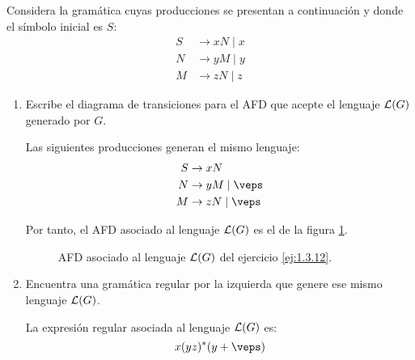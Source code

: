 \begin{ejercicio}\label{ej:1.3.12}
    Considera la gramática cuyas producciones se presentan a continuación y donde el símbolo inicial es $S$:
    \begin{align*}
        S &\rightarrow xN\mid  x \\
        N &\rightarrow yM\mid  y \\
        M &\rightarrow zN\mid  z
    \end{align*}
    \begin{enumerate}
        \item Escribe el diagrama de transiciones para el AFD que acepte el lenguaje $\mathcal{L}(G)$ generado por $G$.
        
        Las siguientes producciones generan el mismo lenguaje:
        \begin{align*}
            S &\rightarrow xN\\
            N &\rightarrow yM\mid \veps \\
            M &\rightarrow zN\mid \veps
        \end{align*}

        Por tanto, el AFD asociado al lenguaje $\mathcal{L}(G)$ es el de la figura \ref{fig:1.3.12-AFD}.
        \begin{figure}[H]
            \centering
            \caption{AFD asociado al lenguaje $\mathcal{L}(G)$ del ejercicio \ref{ej:1.3.12}.}
            \label{fig:1.3.12-AFD}
        \end{figure}
        \item Encuentra una gramática regular por la izquierda que genere ese mismo lenguaje $\mathcal{L}(G)$.
        
        La expresión regular asociada al lenguaje $\mathcal{L}(G)$ es:
        \begin{equation*}
            x(yz)^{\ast}(y+\veps)
        \end{equation*}
        

\end{enumerate}
\end{ejercicio}
